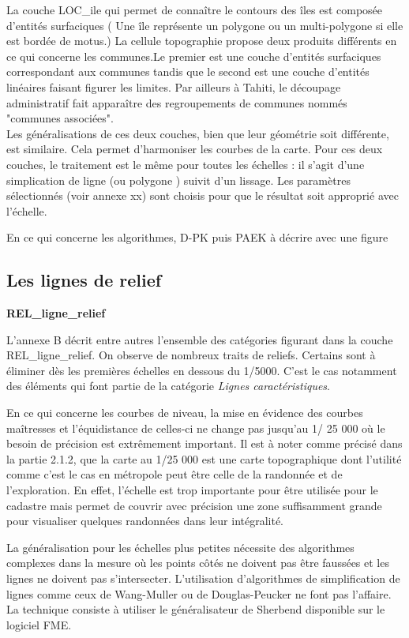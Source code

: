 La couche LOC\_ile qui permet de connaître le contours des îles est composée d'entités surfaciques ( Une île représente un polygone ou un multi-polygone si elle est bordée de motus.)
La cellule topographie propose deux produits différents en ce qui concerne les communes.Le premier est une couche d'entités surfaciques correspondant aux communes tandis que le second est une couche d'entités linéaires faisant figurer les limites. Par ailleurs à Tahiti, le découpage administratif fait apparaître des regroupements de communes nommés "communes associées".\\

Les généralisations de ces deux couches, bien que leur géométrie soit différente, est similaire. Cela permet d'harmoniser les courbes de la carte. Pour ces deux couches, le traitement est le même pour toutes les échelles : il s'agit d'une simplication de ligne (ou polygone ) suivit d'un lissage. Les paramètres sélectionnés (voir annexe xx) sont choisis pour que le résultat soit approprié avec l'échelle.

En ce qui concerne les algorithmes, D-PK puis PAEK à décrire avec une figure

\subsection{Les lignes de relief}
\begin{center}
    \footnotesize
    \textbf{REL\_ligne\_relief}
\end{center}
L'annexe B décrit entre autres l'ensemble des catégories figurant dans la couche REL\_ligne\_relief. On observe de nombreux traits de reliefs. Certains sont à éliminer dès les premières échelles en dessous du 1/5000. C'est le cas notamment des éléments qui font partie de la catégorie \textit{Lignes caractéristiques}. 

En ce qui concerne les courbes de niveau, la mise en évidence des courbes maîtresses et l'équidistance de celles-ci ne change pas jusqu'au 1/ 25 000 où le besoin de précision est extrêmement important. Il est à noter comme précisé dans la partie 2.1.2, que la carte au 1/25 000 est une carte topographique dont l'utilité comme c'est le cas en métropole peut être celle de la randonnée et de l'exploration. En effet, l'échelle est trop importante pour être utilisée pour le cadastre mais permet de couvrir avec précision une zone suffisamment grande pour visualiser quelques randonnées dans leur intégralité.

La généralisation pour les échelles plus petites nécessite des algorithmes complexes dans la mesure où les points côtés ne doivent pas être faussées et les lignes ne doivent pas s'intersecter. L'utilisation d'algorithmes de simplification de lignes comme ceux de Wang-Muller ou de Douglas-Peucker ne font pas l'affaire. La technique consiste à utiliser le généralisateur de Sherbend disponible sur le logiciel FME. 

